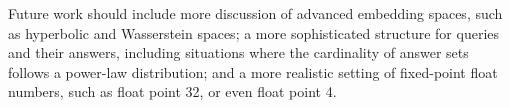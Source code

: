 \documentclass[10pt]{article}
\begin{document}
Future work should include more discussion of advanced embedding spaces, such as hyperbolic and Wasserstein spaces; a more sophisticated structure for queries and their answers, including situations where the cardinality of answer sets follows a power-law distribution; and a more realistic setting of fixed-point float numbers, such as float point 32, or even float point 4.

\clearpage




\appendix


\end{document}
